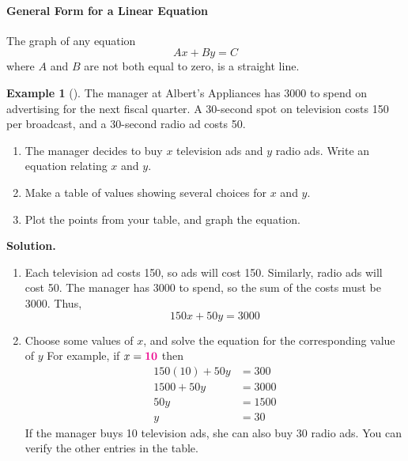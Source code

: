 \documentclass[10pt,]{book}
\theoremstyle{plain}
\theoremstyle{definition}
\theoremstyle{definition}
\theoremstyle{definition}
\newtheorem{example}[theorem]{Example}
\theoremstyle{definition}
\theoremstyle{definition}
\numberwithin{equation}{section}
\newcommand{\alert}[1]{\mathbf{\color{magenta}{#1}}}
\newcommand{\amp}{ & }
\begin{document}
\paragraph[General Form for a Linear Equation]{General Form for a Linear Equation}\label{paragraphs-2}
The graph of any equation \begin{equation*}Ax+By=C\end{equation*} where \(A\) and \(B\) are not both equal to zero, is a straight line.%
\begin{example}[]\label{example-advertising}
The manager at Albert's Appliances has \textdollar{}3000 to spend on advertising for the next fiscal quarter.  A 30-second spot on television costs \textdollar{}150 per broadcast, and a 30-second radio ad costs \textdollar{}50.%
\leavevmode%
\begin{enumerate}[label=*\alph**]
\item\hypertarget{li-44}{}The manager decides to buy \(x\) television ads and \(y\) radio ads.  Write an equation relating \(x\) and \(y\).%
\item\hypertarget{li-45}{}Make a table of values showing several choices for \(x\) and \(y\).%
\item\hypertarget{li-46}{}Plot the points from your table, and graph the equation.%
\end{enumerate}
\par\medskip\noindent%
\textbf{Solution.}\quad \leavevmode%
\begin{enumerate}[label=*\alph**]
\item\hypertarget{li-47}{}Each television ad costs \textdollar{}150, so ads will cost \textdollar{}150.  Similarly, radio ads will cost \textdollar{}50.  The manager has \textdollar{}3000 to spend, so the sum of the costs must be \textdollar{}3000.  Thus, \begin{equation*}150x+50y=3000\end{equation*}%
\item\hypertarget{li-48}{}Choose some values of \(x\), and solve the equation for the corresponding value of \(y\)  For example, if \(x=\alert{10}\) then
               \begin{align*}
150(10)+50y\amp=300\\
1500+50y\amp=3000\\
50y\amp=1500\\
y\amp=30
\end{align*}
                If the manager buys 10 television ads, she can also buy 30 radio ads.  You can verify the other entries in the table.%

\end{enumerate}
\end{example}
\end{document}
